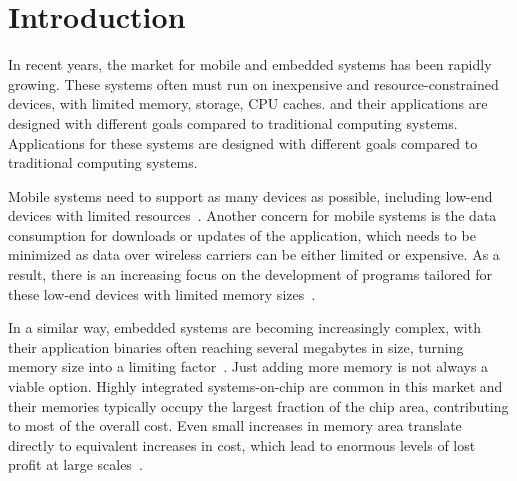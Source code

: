 
\chapter{Introduction}

In recent years, the market for mobile and embedded systems has been rapidly growing.
These systems often must run on inexpensive and resource-constrained devices, with limited memory, storage, CPU caches. and their applications are designed with different goals compared to traditional computing systems.
Applications for these systems are designed with different goals compared to traditional computing systems.


Mobile systems need to support as many devices as possible, including low-end devices with limited resources~\cite{hart02,etzo10}.
Another concern for mobile systems is the data consumption for downloads or updates of the application, which needs to be minimized as data over wireless carriers can be either limited or expensive.
As a result, there is an increasing focus on the development of programs tailored for these low-end devices with limited memory sizes~\cite{androidGo,hahm16}.

In a similar way, embedded systems are becoming increasingly complex, with their application binaries often reaching several megabytes in size, turning memory size into a limiting factor~\cite{plaza18}.
Just adding more memory is not always a viable option.
Highly integrated systems-on-chip are common in this market and their memories typically occupy the largest fraction of the chip area, contributing to most of the overall cost.
Even small increases in memory area translate directly to equivalent increases in cost, which lead to enormous levels of lost profit at large scales~\cite{edler10}.

